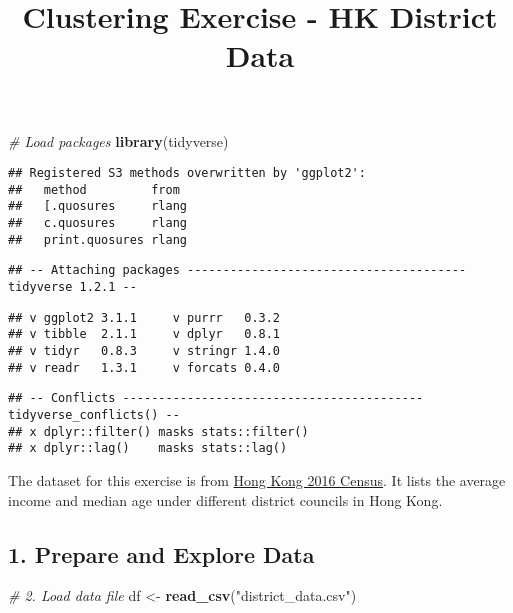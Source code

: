 \documentclass[]{article}
\title{Clustering Exercise - HK District Data}
\author{}
\date{}
\newenvironment{Shaded}{\begin{snugshade}}{\end{snugshade}}
\newcommand{\CommentTok}[1]{\textcolor[rgb]{0.56,0.35,0.01}{\textit{#1}}}
\newcommand{\KeywordTok}[1]{\textcolor[rgb]{0.13,0.29,0.53}{\textbf{#1}}}
\newcommand{\NormalTok}[1]{#1}
\newcommand{\StringTok}[1]{\textcolor[rgb]{0.31,0.60,0.02}{#1}}
\begin{document}
\maketitle

\begin{Shaded}
\begin{Highlighting}[]
\CommentTok{# Load packages}
\KeywordTok{library}\NormalTok{(tidyverse)}
\end{Highlighting}
\end{Shaded}

\begin{verbatim}
## Registered S3 methods overwritten by 'ggplot2':
##   method         from 
##   [.quosures     rlang
##   c.quosures     rlang
##   print.quosures rlang
\end{verbatim}

\begin{verbatim}
## -- Attaching packages --------------------------------------- tidyverse 1.2.1 --
\end{verbatim}

\begin{verbatim}
## v ggplot2 3.1.1     v purrr   0.3.2
## v tibble  2.1.1     v dplyr   0.8.1
## v tidyr   0.8.3     v stringr 1.4.0
## v readr   1.3.1     v forcats 0.4.0
\end{verbatim}

\begin{verbatim}
## -- Conflicts ------------------------------------------ tidyverse_conflicts() --
## x dplyr::filter() masks stats::filter()
## x dplyr::lag()    masks stats::lag()
\end{verbatim}

The dataset for this exercise is from
\href{https://www.bycensus2016.gov.hk/en/}{Hong Kong 2016 Census}. It
lists the average income and median age under different district
councils in Hong Kong.

\hypertarget{prepare-and-explore-data}{%
\subsection{1. Prepare and Explore
Data}\label{prepare-and-explore-data}}

\begin{Shaded}
\begin{Highlighting}[]
\CommentTok{# 2. Load data file}
\NormalTok{df <-}\StringTok{ }\KeywordTok{read_csv}\NormalTok{(}\StringTok{"district_data.csv"}\NormalTok{)}
\end{Highlighting}
\end{Shaded}
\end{document}
